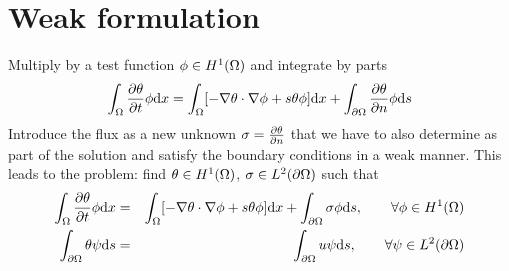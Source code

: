 \documentclass[11pt, oneside]{article}   	%
\newcommand{\bOmega}{{\partial\Omega}}
\begin{document}
\section{Weak formulation}
Multiply by a test function $\phi \in H^1(\Omega)$ and integrate by parts
\[
\int_\Omega \df{\theta}{t}\phi \ud x = \int_\Omega [-\nabla\theta \cdot \nabla\phi + s \theta \phi] \ud x + \int_\bOmega \df{\theta}{n} \phi \ud s
\]
Introduce the flux as a new unknown $\sigma = \frac{\partial \theta}{\partial n}$ that we have to also determine as part of the solution and satisfy the boundary conditions in a weak manner. This leads to the problem: find $\theta \in H^1(\Omega)$, $\sigma \in L^2(\partial\Omega)$ such that
\begin{eqnarray}
\int_\Omega \df{\theta}{t}\phi \ud x &=& \int_\Omega [-\nabla\theta \cdot \nabla\phi + s \theta \phi] \ud x + \int_\bOmega \sigma \phi \ud s, \qquad \forall \phi \in \HoO \\
\int_\bOmega \theta \psi \ud s &=& \int_\bOmega u \psi \ud s, \qquad \forall \psi \in \LtbO
\end{eqnarray}

\end{document}
